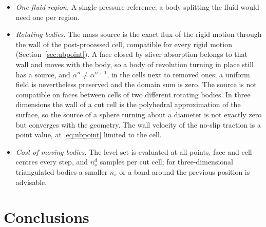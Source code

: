 \documentclass[11pt,a4paper]{article}
\theoremstyle{remark}
\begin{document}
\begin{itemize}
      point-interpolated fraction: $\theta$ differs from the exact fractions by $O(h)$ (up
      to $0.11$ at $h=0.12$ on the cylinder), the wall position by $O(h^2)$, and $\theta$ is not
      consistent with $\alpha$ cell by cell (a per-cell iso-value would make it so). With the
      centroids and the wall distance of the interpolant the drag converges at second order
      to the level-set value (difference $-0.4\%$ at $h=0.12$, $-0.02\%$ at $h=0.03$).
\item \emph{One fluid region.} A single pressure reference; a body splitting the fluid would
      need one per region.
\item \emph{Rotating bodies.} The mass source is the exact flux of the rigid motion through
      the wall of the post-processed cell, compatible for every rigid motion
      (Section~\ref{sec:ubpoint}). A face closed by sliver absorption belongs to that wall and
      moves with the body, so a body of revolution turning in place still has a source, and
      $\alpha^n\neq\alpha^{n+1}$, in the cells next to removed ones; a uniform field is
      nevertheless preserved and the domain sum is zero. The source is not compatible on faces
      between cells of two different rotating bodies. In three dimensions the wall of a cut
      cell is the polyhedral approximation of the surface, so the source of a sphere turning
      about a diameter is not exactly zero but converges with the geometry. The wall velocity
      of the no-slip traction is a point value, at \eqref{eq:ubpoint} limited to the cell.
\item \emph{Cost of moving bodies.} The level set is evaluated at all points, face and cell
      centres every step, and $n_s^d$ samples per cut cell; for three-dimensional
      triangulated bodies a smaller $n_s$ or a band around the previous position is advisable.
\end{itemize}

\section{Conclusions}
\end{document}
